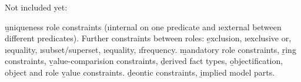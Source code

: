 \documentclass[a4paper,10pt]{article}
\begin{document}
Not included yet:

\b{uniqueness role constraints} (\i{internal} on one predicate
and \i{external} between different predicates). Further constraints
between roles: \b{exclusion}, \i{exclusive or}, \i{equality},
\i{subset/superset}, \i{equality}, \i{frequency}.
\b{mandatory role constraints}, \b{ring constraints},
\b{value-comparision constraints}, \b{derived fact types},
\b{objectification}, object and role \b{value constraints}.
\b{deontic constraints}, \b{implied model parts}.
\end{document}
